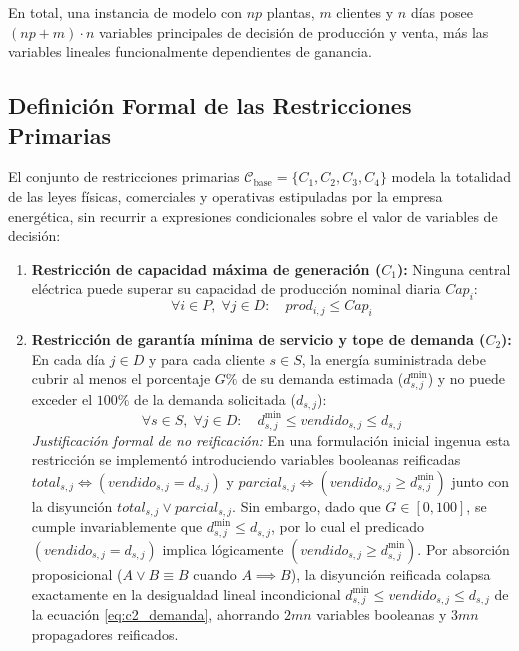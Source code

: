 En total, una instancia de modelo con $np$ plantas, $m$ clientes y $n$ días posee $(np + m)\cdot n$ variables principales de decisión de producción y venta, más las variables lineales funcionalmente dependientes de ganancia.

\subsection{Definición Formal de las Restricciones Primarias}

El conjunto de restricciones primarias $\mathcal{C}_{\text{base}} = \{C_1, C_2, C_3, C_4\}$ modela la totalidad de las leyes físicas, comerciales y operativas estipuladas por la empresa energética, sin recurrir a expresiones condicionales sobre el valor de variables de decisión:

\begin{enumerate}
    \item \textbf{Restricción de capacidad máxima de generación ($C_1$):} Ninguna central eléctrica puede superar su capacidad de producción nominal diaria $Cap_i$:
    \begin{equation}
        \forall i \in P, \; \forall j \in D: \quad prod_{i,j} \le Cap_i
        \label{eq:c1_capacidad}
    \end{equation}

    \item \textbf{Restricción de garantía mínima de servicio y tope de demanda ($C_2$):} En cada día $j \in D$ y para cada cliente $s \in S$, la energía suministrada debe cubrir al menos el porcentaje $G\%$ de su demanda estimada ($d^{\min}_{s,j}$) y no puede exceder el $100\%$ de la demanda solicitada ($d_{s,j}$):
    \begin{equation}
        \forall s \in S, \; \forall j \in D: \quad d^{\min}_{s,j} \le vendido_{s,j} \le d_{s,j}
        \label{eq:c2_demanda}
    \end{equation}
    \emph{Justificación formal de no reificación:} En una formulación inicial ingenua esta restricción se implementó introduciendo variables booleanas reificadas $total_{s,j} \iff (vendido_{s,j} = d_{s,j})$ y $parcial_{s,j} \iff (vendido_{s,j} \ge d^{\min}_{s,j})$ junto con la disyunción $total_{s,j} \lor parcial_{s,j}$. Sin embargo, dado que $G \in [0, 100]$, se cumple invariablemente que $d^{\min}_{s,j} \le d_{s,j}$, por lo cual el predicado $(vendido_{s,j} = d_{s,j})$ implica lógicamente $(vendido_{s,j} \ge d^{\min}_{s,j})$. Por absorción proposicional ($A \lor B \equiv B$ cuando $A \implies B$), la disyunción reificada colapsa exactamente en la desigualdad lineal incondicional $d^{\min}_{s,j} \le vendido_{s,j} \le d_{s,j}$ de la ecuación \eqref{eq:c2_demanda}, ahorrando $2mn$ variables booleanas y $3mn$ propagadores reificados.


\end{enumerate}
